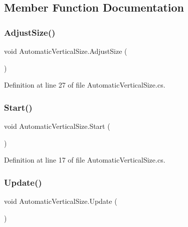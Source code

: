 \subsection{Member Function Documentation}
\mbox{\label{class_automatic_vertical_size_a2f74f8b213c2ecdaae4a05487691bbe0}} 
\subsubsection{\texorpdfstring{Adjust\+Size()}{AdjustSize()}}
{\footnotesize\ttfamily void Automatic\+Vertical\+Size.\+Adjust\+Size (\begin{DoxyParamCaption}{ }\end{DoxyParamCaption})}



Definition at line 27 of file Automatic\+Vertical\+Size.\+cs.

\mbox{\label{class_automatic_vertical_size_a4f195ccac99473238e7d49dece8de7fa}} 
\subsubsection{\texorpdfstring{Start()}{Start()}}
{\footnotesize\ttfamily void Automatic\+Vertical\+Size.\+Start (\begin{DoxyParamCaption}{ }\end{DoxyParamCaption})}



Definition at line 17 of file Automatic\+Vertical\+Size.\+cs.

\mbox{\label{class_automatic_vertical_size_a2e08b94693c7043ac19320b669de4c7d}} 
\subsubsection{\texorpdfstring{Update()}{Update()}}
{\footnotesize\ttfamily void Automatic\+Vertical\+Size.\+Update (\begin{DoxyParamCaption}{ }\end{DoxyParamCaption})}



